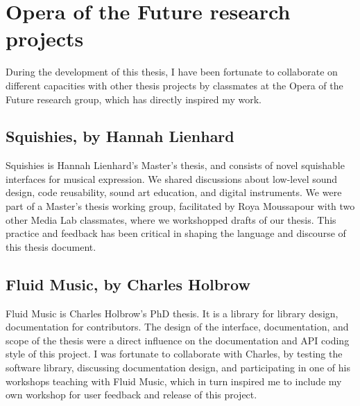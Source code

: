 \section{Opera of the Future research projects}

During the development of this thesis, I have been fortunate to collaborate on different capacities with other thesis projects by classmates at the Opera of the Future research group, which has directly inspired my work.

\subsection{Squishies, by Hannah Lienhard}

Squishies is Hannah Lienhard's Master's thesis, and consists of novel squishable interfaces for musical expression. We shared discussions about low-level sound design, code reusability, sound art education, and digital instruments. We were part of a Master's thesis working group, facilitated by Roya Moussapour with two other Media Lab classmates, where we workshopped drafts of our thesis. This practice and feedback has been critical in shaping the language and discourse of this thesis document.

\subsection{Fluid Music, by Charles Holbrow}

Fluid Music is Charles Holbrow's PhD thesis. It is a library for library design, documentation for contributors. The design of the interface, documentation, and scope of the thesis were a direct influence on the documentation and API coding style of this project. I was fortunate to collaborate with Charles, by testing the software library, discussing documentation design, and participating in one of his workshops teaching with Fluid Music, which in turn inspired me to include my own workshop for user feedback and release of this project.

